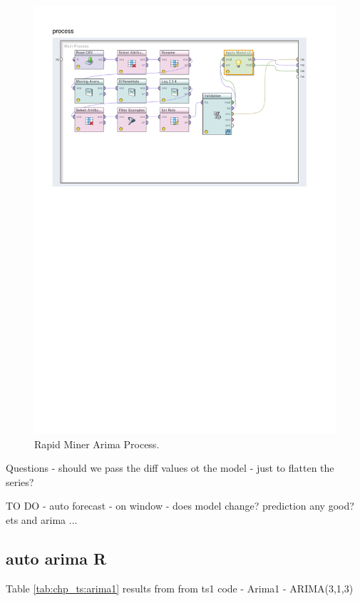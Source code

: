 \begin{figure}[!tbh]
\centering
\includegraphics[width=12cm]{../Figures/chp_ts_rm_arima}
\caption[Rapid Miner Arima Process]{Rapid Miner Arima Process.}
\label{fig:chp_ts_rm_arima}
\end{figure}

Questions - should we pass the diff values ot the model - just to flatten the series?

TO DO - auto forecast - on window - does model change? prediction any good? ets and arima ...

\subsection{auto arima R}

Table \ref{tab:chp_ts:arima1} results from from ts1 code - Arima1 - ARIMA(3,1,3)
